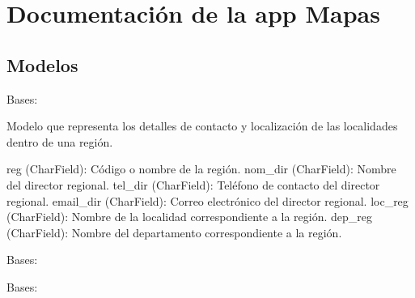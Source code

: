 \documentclass[letterpaper,10pt,spanish]{sphinxmanual}
\begin{document}
\sphinxstepscope


\chapter{Documentación de la app Mapas}
\label{\detokenize{mapas:documentacion-de-la-app-mapas}}\label{\detokenize{mapas::doc}}

\section{Modelos}
\label{\detokenize{mapas:modelos}}

\begin{fulllineitems}

\pysigstartsignatures
{}
\pysigstopsignatures
\sphinxAtStartPar
Bases: 

\sphinxAtStartPar
Modelo que representa los detalles de contacto y localización de las localidades dentro de una región.
\begin{description}
\sphinxAtStartPar
reg (CharField): Código o nombre de la región.
nom\_dir (CharField): Nombre del director regional.
tel\_dir (CharField): Teléfono de contacto del director regional.
email\_dir (CharField): Correo electrónico del director regional.
loc\_reg (CharField): Nombre de la localidad correspondiente a la región.
dep\_reg (CharField): Nombre del departamento correspondiente a la región.

\end{description}


\begin{fulllineitems}

\pysigstartsignatures
{}
\pysigstopsignatures
\sphinxAtStartPar
Bases: 

\end{fulllineitems}



\begin{fulllineitems}

\pysigstartsignatures
{}
\pysigstopsignatures
\sphinxAtStartPar
Bases: 


\end{fulllineitems}
\end{fulllineitems}
\end{document}
